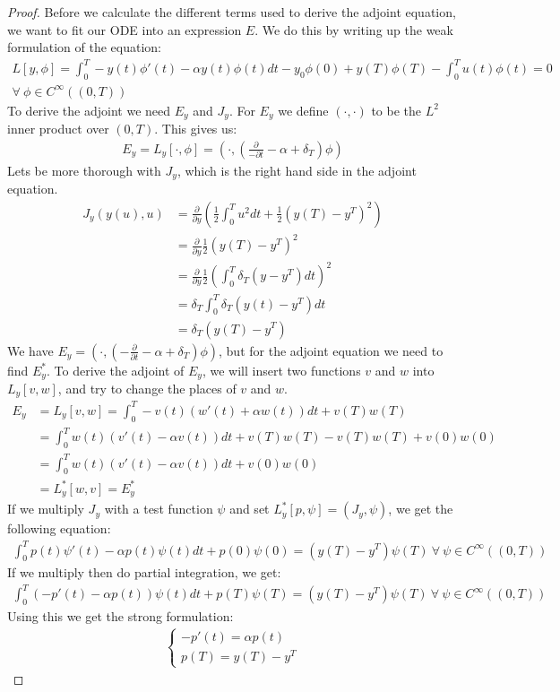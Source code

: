 \documentclass[11pt,a4paper]{article}
\begin{document}
\begin{proof}
Before we calculate the different terms used to derive the adjoint equation, we want to fit our ODE into an expression $E$. We do this by writing up the weak formulation of the equation:
\begin{gather*}
L[y,\phi] = \int_0^T-y(t)\phi'(t)-\alpha y(t)\phi(t)dt -y_0\phi(0)+y(T)\phi(T)-\int_0^Tu(t)\phi(t)=0\\ \forall \ \phi \in C^{\infty}((0,T))
\end{gather*}
To derive the adjoint we need $E_y$ and $J_y$. For $E_y$ we define $(\cdot,\cdot)$ to be the $L^2$ inner product over $(0,T)$. This gives us:
\begin{align*}
E_y=L_y[\cdot,\phi]=(\cdot,(\frac{\partial}{-\partial t} - \alpha + \delta_T)\phi)  
\end{align*}
Lets be more thorough with $J_y$, which is the right hand side in the adjoint equation.
\begin{align*}
J_y(y(u),u) &= \frac{\partial}{\partial y}(\frac{1}{2}\int_0^Tu^2dt + \frac{1}{2}(y(T)-y^T)^2) \\ &= \frac{\partial}{\partial y} \frac{1}{2}(y(T)-y^T)^2 \\
&= \frac{\partial}{\partial y}\frac{1}{2}(\int_0^T \delta_T(y-y^T)dt)^2 \\
&= \delta_T\int_0^T \delta_T(y(t)-y^T)dt \\
&= \delta_T(y(T)-y^T)
\end{align*}
We have $E_y=(\cdot,(-\frac{\partial}{\partial t} - \alpha + \delta_T)\phi)$, but for the adjoint equation we need to find $E_y^*$.
To derive the adjoint of $E_y$, we will insert two functions $v$ and $w$ into $L_y[v,w]$, and try to change the places of $v$ and $w$.
\begin{align*}
E_y&=L_y[v,w]=\int_0^T-v(t)(w'(t)+\alpha w(t))dt + v(T)w(T) \\
&=\int_0^Tw(t)(v'(t)-\alpha v(t))dt + v(T)w(T)-v(T)w(T) +v(0)w(0) \\
&=\int_0^Tw(t)(v'(t)-\alpha v(t))dt+v(0)w(0) \\
&=L_y^*[w,v]=E_y^*
\end{align*}
If we multiply $J_y$ with a test function $\psi$ and set $L_y^*[p,\psi]=(J_y,\psi)$, we get the following equation:
\begin{align*}
\int_0^Tp(t)\psi'(t)-\alpha p(t)\psi(t)dt + p(0)\psi(0)= (y(T)-y^T)\psi(T)\ \forall \ \psi \in C^{\infty}((0,T))
\end{align*}
If we multiply then do partial integration, we get:
\begin{align*}
\int_0^T(-p'(t)-\alpha p(t))\psi(t)dt +p(T)\psi(T)= (y(T)-y^T)\psi(T)\ \forall \ \psi \in C^{\infty}((0,T))
\end{align*}
Using this we get the strong formulation:
\begin{align*}
   \left\{
     \begin{array}{lr}
       -p'(t) = \alpha p(t) \\
       p(T) = y(T)-y^T
     \end{array}
   \right.
\end{align*}
\end{proof}
\end{document}
